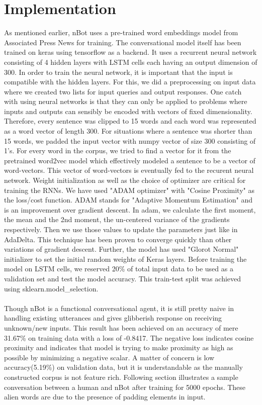 \documentclass[letterpaper] {article} %
\begin{document}
\section{Implementation}
As mentioned earlier, nBot uses a pre-trained word embeddings model from Associated Press News for training. The conversational model itself has been trained on keras using tensorflow as a backend. It uses a recurrent neural network consisting of 4 hidden layers with LSTM cells each having an output dimension of 300. In order to train the neural network, it is important that the input is compatible with the hidden layers. For this, we did a preprocessing on input data where we created two lists for input queries and output responses. One catch with using neural networks is that they can only be applied to problems where inputs and outputs can sensibly be encoded with vectors of fixed dimensionality. Therefore, every sentence was clipped to 15 words and each word was represented as a word vector of length 300. For situations where a sentence was shorter than 15 words, we padded the input vector with numpy vector of size 300 consisting of 1's. For every word in the corpus, we tried to find a vector for it from the pretrained word2vec model which effectively modeled a sentence to be a vector of word-vectors. This vector of word-vectors is eventually fed to the recurent neural network. Weight initialization as well as the choice of optimizer are critical for training the RNNs. We have used "ADAM optimizer" with "Cosine Proximity" as the loss/cost function. ADAM stands for "Adaptive Momentum Estimation" and is an improvement over gradient descent. In adam, we calculate the first moment, the mean and the 2nd moment, the un-centered variance of the gradients respectively. Then we use those values to update the parameters just like in AdaDelta. This technique has been proven to converge quickly than other variations of gradient descent\cite{kingma2014adam}. Further, the model has used "Glorot Normal" initializer to set the initial random weights of Keras layers. Before training the model on LSTM cells, we reserved 20\% of total input data to be used as a validation set and test the model accuracy. This train-test split was achieved using sklearn.model\_selection.
\\\\
Though nBot is a functional conversational agent, it is still pretty naive in handling existing utterances and gives glibberish response on receiving unknown/new inputs. This result has been achieved on an accuracy of mere 31.67\% on training data with a loss of -0.8417. The negative loss indicates cosine proximity and indicates that model is trying to make proximity as high as possible by minimizing a negative scalar. A matter of concern is low accuracy(5.19\%) on validation data, but it is understandable as the manually constructed corpus is not feature rich. Following section illustrates a sample conversation between a human and nBot after training for 5000 epochs. These alien words are due to the presence of padding elements in input.
\end{document}
